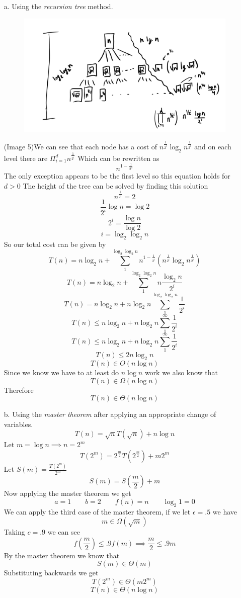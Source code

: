 \documentclass{article}
\begin{document}
\begin{itemize}
\item [a.] Using the \emph{recursion tree} method.
\begin{figure}
    \includegraphics[width=\linewidth]{Image 5.png}
\end{figure}
(Image 5)We can see that each node has a cost of $n^{\frac{1}{2^i}}\log_{2}{n^{\frac{1}{2^i}}}$ and on each level there are $\Pi_{i=1}^{d}n^{\frac{1}{2^i}}$
Which can be rewritten as
$$ n^{1-\frac{1}{2^{d}}} $$
The only exception appears to be the first level so this equation holds for $d > 0 $
The height of the tree can be solved by finding this solution
$$ n^{\frac{1}{2^i}} = 2$$
$$ \frac{1}{2^i} \log{n} = \log{2} $$
$$ 2^i = \frac{\log{n}}{\log{2}} $$
$$ i = \log_{2}{{\log_{2}{n}}}$$
So our total cost can be given by
$$ T(n) = n\log_{2}{n} + \sum_{1}^{\log_{2}{\log_{2}{n}}} n^{1-\frac{1}{2^{i}}}(n^{\frac{1}{2^i}}\log_{2}{n^{\frac{1}{2^i}}})$$
$$ T(n) = n\log_{2}{n} + \sum_{1}^{\log_{2}{\log_{2}{n}}} n\frac{\log_{2}{n}}{2^i}$$
$$ T(n) = n\log_{2}{n} + n\log_{2}{n}\sum_{1}^{\log_{2}{\log_{2}{n}}} \frac{1}{2^i}$$
$$ T(n) \leq n\log_{2}{n} + n\log_{2}{n}\sum_{1}^{\infty} \frac{1}{2^i}$$
$$ T(n) \leq n\log_{2}{n} + n\log_{2}{n}\sum_{1}^{\infty} \frac{1}{2^i}$$
$$ T(n) \leq 2n\log_{2}{n} $$
$$ T(n) \in O(n\log{n})$$
Since we know we have to at least do $n\log{n}$ work we also know that
$$ T(n) \in \Omega(n\log{n})$$
Therefore
$$ T(n) \in \Theta(n\log{n})$$

\item [b.] Using the \emph{master theorem} after applying an appropriate change of variables.
$$ T(n) = \sqrt{n}T(\sqrt{n})+n\log{n} $$
Let $ m = \log{n} \implies n=2^m $
$$ T(2^m) = 2^{\frac{m}{2}}T(2^{\frac{m}{2}}) +m2^m $$
Let $ S(m) = \frac{T(2^m)}{2^m} $
$$ S(m) = S(\frac{m}{2}) + m $$
Now applying the master theorem we get
$$ a = 1 \qquad b = 2 \qquad f(n)=n \qquad \log_{2}{1} = 0 $$
We can apply the third case of the master theorem, if we let $\epsilon = .5$ we have
$$ m \in \Omega(\sqrt{m}) $$
Taking $ c = .9 $ we can see
$$f(\frac{m}{2}) \leq .9f(m) \implies \frac{m}{2} \leq .9m $$
By the master theorem we know that
$$ S(m) \in \Theta(m) $$
Substituting backwards we get
$$ T(2^m) \in \Theta(m2^m) $$
$$ T(n) \in \Theta(n\log{n}) $$

\end{itemize}
\end{document}
